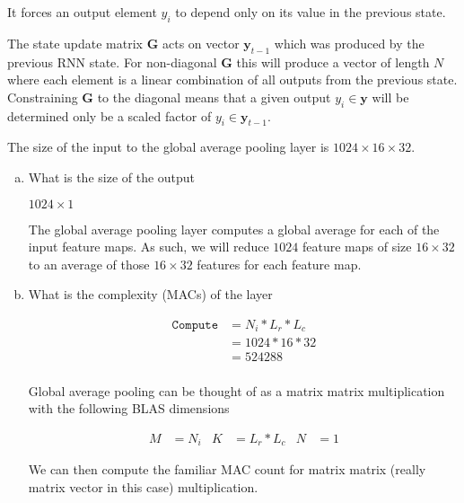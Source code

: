 \documentclass[11pt]{article}
\begin{document}
\begin{solution}
	It forces an output element $y_i$ to depend only on its value in the
	previous state.
	\newline

	The state update matrix $\boldsymbol{G}$ acts on vector
	$\boldsymbol{y}_{t-1}$ which was produced by the previous RNN state. For
	non-diagonal $\boldsymbol{G}$ this will produce a vector of length $N$
	where each element is a linear combination of all outputs from the previous
	state.
	Constraining $\boldsymbol{G}$ to the diagonal means that a given output
	$y_i \in \boldsymbol{y}$ will be determined only be a scaled factor of $y_i
	\in \boldsymbol{y}_{t-1}$.
\end{solution}

The size of the input to the global average pooling layer is
$1024\times16\times32$.
\begin{enumerate}[(a)]\itemsep0pt
	\item What is the size of the output
		\begin{solution}
			$1024 \times 1$

			The global average pooling layer computes a global average for each
			of the input feature maps. As such, we will reduce $1024$ feature
			maps of size $16\times32$ to an average of those $16\times32$
			features for each feature map.
		\end{solution}
	\item What is the complexity (MACs) of the layer
		\begin{solution}
			\begin{align}
				\texttt{Compute} &= N_i * L_r * L_c \\
					&= 1024*16*32 \\
					&= 524288 \\
			\end{align}

			Global average pooling can be thought of as a matrix matrix
			multiplication with the following BLAS dimensions

			\begin{align}
				M &= N_i & K &= L_r * L_c & N &= 1
			\end{align}

			We can then compute the familiar MAC count for matrix matrix
			(really matrix vector in this case) multiplication.
		\end{solution}
\end{enumerate}
\end{document}
